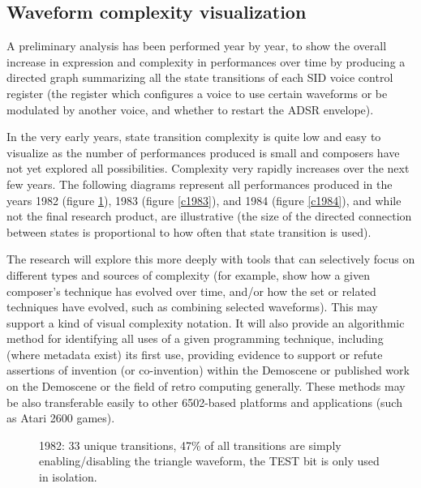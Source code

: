 \documentclass[10pt]{article}
\begin{document}
\begin{multicols*}{2}
\subsection{Waveform complexity visualization}
\label{complexity}

A preliminary analysis has been performed year by year, to show the overall increase in expression and complexity in performances over time by producing a directed graph summarizing all the state transitions of each SID voice control register (the register which configures a voice to use certain waveforms or be modulated by another voice, and whether to restart the ADSR envelope).

In the very early years, state transition complexity is quite low and easy to visualize as the number of performances produced is small and composers have not yet explored all possibilities. Complexity very rapidly increases over the next few years. The following diagrams represent all performances produced in the years 1982 (figure \ref{c1982}), 1983 (figure \ref{c1983}), and 1984 (figure \ref{c1984}), and while not the final research product, are illustrative (the size of the directed connection between states is proportional to how often that state transition is used).

The research will explore this more deeply with tools that can selectively focus on different types and sources of complexity (for example, show how a given composer’s technique has evolved over time, and/or how the set or related techniques have evolved, such as combining selected waveforms). This may support a kind of visual complexity notation. It will also provide an algorithmic method for identifying all uses of a given programming technique, including (where metadata exist) its first use, providing evidence to support or refute assertions of invention (or co-invention) within the Demoscene or published work on the Demoscene\cite{gatekeepers} or the field of retro computing generally. These methods may be also transferable easily to other 6502-based platforms and applications (such as Atari 2600 games).

\begin{figure}
\noindent{}
\caption{1982: 33 unique transitions, 47\% of all transitions are simply enabling/disabling the triangle waveform, the TEST bit is only used in isolation.}
\label{c1982}
\end{figure}


\end{multicols*}
\end{document}
